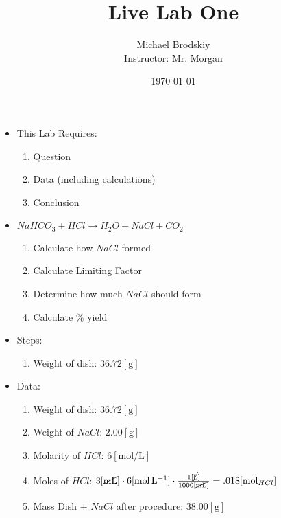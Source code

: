 \documentclass[12pt]{article}
\title{Live Lab One}
\date{\today}
\author{Michael Brodskiy\\ \small Instructor: Mr. Morgan}
\begin{document}
\maketitle

\begin{itemize}

  \item This Lab Requires:

    \begin{enumerate}

      \item Question

      \item Data (including calculations)
        
      \item Conclusion

    \end{enumerate}

  \item $NaHCO_3 + HCl\rightarrow H_2O+NaCl+CO_2$

    \begin{enumerate}

      \item Calculate how $NaCl$ formed

      \item Calculate Limiting Factor

      \item Determine how much $NaCl$ should form

      \item Calculate \% yield

    \end{enumerate}

  \item Steps:

    \begin{enumerate}

      \item Weight of dish: $36.72[\si{\gram}]$

    \end{enumerate}

  \item Data:

    \begin{enumerate}

      \item Weight of dish: $36.72[\si{\gram}]$

      \item Weight of $NaCl$: $2.00[\si{\gram}]$

      \item Molarity of $HCl$: $6[\si{\mole\per\liter}]$

      \item Moles of $HCl$: $3[\cancel{\si{\milli\liter}}]\cdot6[\si{\mole\per\liter}]\cdot\frac{1[\cancel{\si{\liter}}]}{1000[\cancel{\si{\milli\liter}}]}=.018[\si{\mole}_{HCl}]$

      \item Mass Dish + $NaCl$ after procedure: $38.00[\si{\gram}]$

    \end{enumerate}

\end{itemize}
\end{document}
